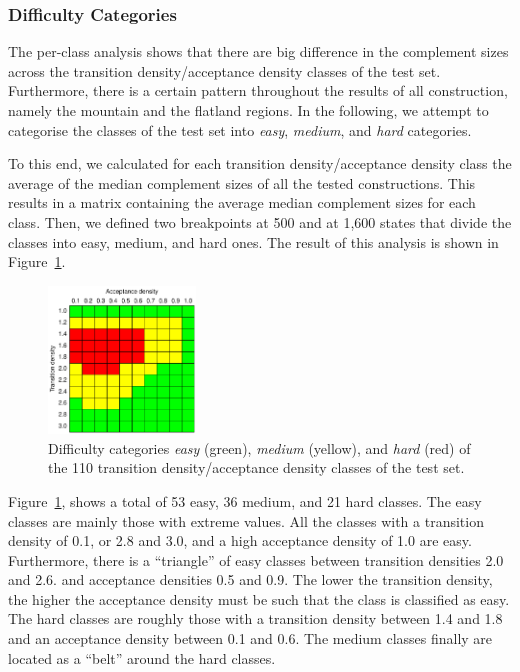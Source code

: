 \subsubsection{Difficulty Categories}
The per-class analysis shows that there are big difference in the complement sizes across the transition density/acceptance density classes of the \goal{} test set. Furthermore, there is a certain pattern throughout the results of all construction, namely the mountain and the flatland regions. In the following, we attempt to categorise the classes of the \goal{} test set into \textit{easy}, \textit{medium}, and \textit{hard} categories. 

To this end, we calculated for each transition density/acceptance density class the average of the median complement sizes of all the tested constructions. This results in a matrix containing the average median complement sizes for each class. Then, we defined two breakpoints at 500 and at 1,600 states that divide the classes into easy, medium, and hard ones. The result of this analysis is shown in Figure~\ref{i.g.difficulty}.

\begin{figure}[ht]
\centering
\includegraphics[width=0.35\textwidth]{figures/r/internal/goal/difficulty.pdf}
\caption{Difficulty categories \textit{easy} (green), \textit{medium} (yellow), and \textit{hard} (red) of the 110 transition density/acceptance density classes of the \goal{} test set.}
\label{i.g.difficulty}
\end{figure}

Figure~\ref{i.g.difficulty}, shows a total of  53 easy, 36 medium, and 21 hard classes. The easy classes are mainly those with extreme values. All the classes with a transition density of 0.1, or 2.8 and 3.0, and a high acceptance density of 1.0 are easy. Furthermore, there is a ``triangle'' of easy classes between transition densities 2.0 and 2.6. and acceptance densities 0.5 and 0.9. The lower the transition density, the higher the acceptance density must be such that the class is classified as easy. The hard classes are roughly those with a transition density between 1.4 and 1.8 and an acceptance density between 0.1 and 0.6. The medium classes finally are located as a ``belt'' around the hard classes.

